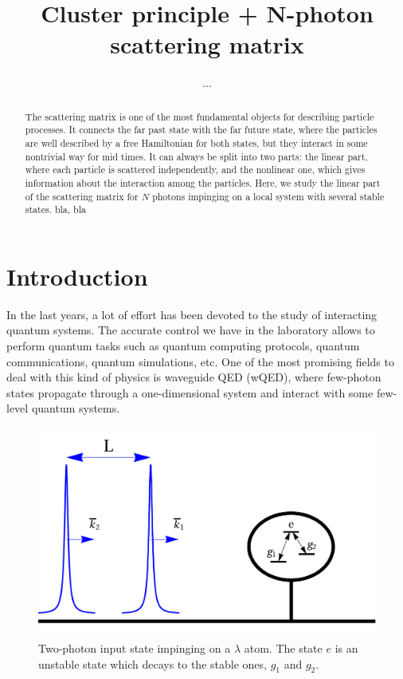 \documentclass[aps,pra,reprint,amsmath,amssymb]{revtex4-1}
\begin{document}
\title{Cluster principle + N-photon scattering matrix}

\author{...}


\begin{abstract}
The scattering matrix is one of the most fundamental objects for
describing particle processes. It connects the far past state with the
far future state, where the particles are well described by a free
Hamiltonian for both states, but they interact in some nontrivial way
for mid times. It can always be split into two parts: the linear part,
where each particle is scattered independently, and the nonlinear one,
which gives information about the interaction among the
particles. Here, we study the linear part of the scattering matrix for
$N$ photons impinging on a local system with several stable states. 
bla, bla
\end{abstract}



\maketitle


\section{Introduction}

In the last years, a lot of effort has been devoted to the study of interacting quantum systems. The accurate control we have in the laboratory allows to perform quantum tasks such as quantum computing protocols, quantum communications, quantum simulations, etc. One of the most promising fields to deal with this kind of physics is waveguide QED (wQED), where few-photon states propagate through a one-dimensional system and interact with some few-level quantum systems. \cite{fan10,Xu2015,Xu2016,Sanchez-Burillo2015,Sanchez-Burillo2016}

\begin{figure}
\includegraphics[scale=0.25]{input.pdf}
\caption{Two-photon input state impinging on a $\lambda$ atom. The state $e$ is an unstable state which decays to the stable ones, $g_1$ and $g_2$.}
\end{figure}
\end{document}
